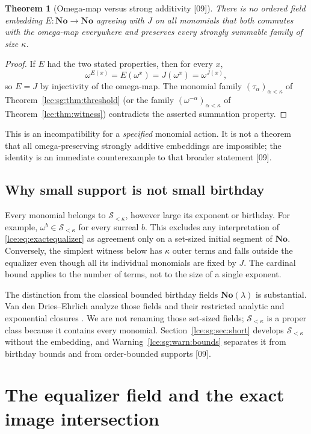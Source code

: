 \documentclass[11pt,letterpaper]{article}
\numberwithin{equation}{section}
\newtheorem{theorem}{Theorem}[section]
\theoremstyle{definition}
\theoremstyle{remark}
\newcommand{\No}{\mathbf{No}}
\newcommand{\Sk}{\mathscr S_{<\kappa}}
\newcommand{\thref}[1]{Theorem~\ref{#1}}
\newcommand{\src}[1]{\textup{\textsf{\small[#1]}}}%
\begin{document}
\begin{theorem}[Omega-map versus strong additivity \src{09}]\label{lce:sg:thm:omega-locus}
There is no ordered field embedding $E:\No\to\No$ agreeing with $J$ on all
monomials that both commutes with the omega-map everywhere and preserves
every strongly summable family of size $\kappa$.
\end{theorem}
\begin{proof}
If $E$ had the two stated properties, then for every $x$,
\[
 \omega^{E(x)}=E(\omega^x)=J(\omega^x)=\omega^{J(x)},
\]
so $E=J$ by injectivity of the omega-map. The monomial family
$(\tau_\alpha)_{\alpha<\kappa}$ of \thref{lce:sg:thm:threshold} (or the
family $(\omega^{-\alpha})_{\alpha<\kappa}$ of \thref{lce:thm:witness})
contradicts the asserted summation property.
\end{proof}
This is an incompatibility for a \emph{specified} monomial action. It is not
a theorem that all omega-preserving strongly additive embeddings are
impossible; the identity is an immediate counterexample to that broader
statement \src{09}.

\subsection{Why small support is not small birthday}
Every monomial belongs to $\Sk$, however large its exponent or birthday.
For example, $\omega^b\in\Sk$ for every surreal $b$. This excludes any
interpretation of \eqref{lce:eq:exactequalizer} as agreement only on a
set-sized initial segment of $\No$.
Conversely, the simplest witness below has $\kappa$ outer terms and falls
outside the equalizer even though all its individual monomials are fixed
by $J$. The cardinal bound applies to the number of terms, not to the
size of a single exponent.

The distinction from the classical bounded birthday fields $\No(\lambda)$
is substantial. Van den Dries--Ehrlich analyze those fields and their
restricted analytic and exponential closures \cite[Proposition~4.7 and
Corollary~5.5]{vdDE}. We are not renaming those set-sized fields; $\Sk$ is a
proper class because it contains every monomial.
Section~\ref{lce:sg:sec:short} develops $\Sk$ without the embedding, and
Warning~\ref{lce:sg:warn:bounds} separates it from birthday bounds and from
order-bounded supports \src{09}.

\section{The equalizer field and the exact image intersection}\label{lce:sec:intersection}
\end{document}
